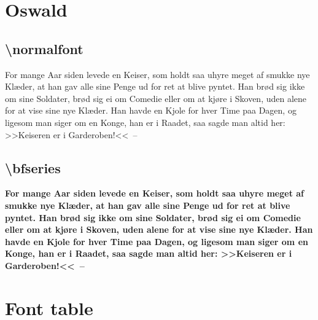 \documentclass[danish,a4paper,11pt]{scrartcl}
\begin{document}
\section*{Oswald}
\subsection*{\textbackslash normalfont}
\normalfont
  For mange Aar siden levede en Keiser, som holdt saa uhyre meget af
   smukke nye Kl\ae der, at han gav alle sine Penge ud for ret at blive
   pyntet. Han br\o d sig ikke om sine Soldater, br\o d sig ei om
   Comedie eller om at kj\o re i Skoven, uden alene for at vise sine
   nye Kl\ae der. Han havde en Kjole for hver Time paa Dagen, og
   ligesom man siger om en Konge, han er i Raadet, saa sagde man altid
   her: >>Keiseren er i Garderoben!<<~--

\subsection*{\textbackslash bfseries}
\normalfont\bfseries
  For mange Aar siden levede en Keiser, som holdt saa uhyre meget af
   smukke nye Kl\ae der, at han gav alle sine Penge ud for ret at blive
   pyntet. Han br\o d sig ikke om sine Soldater, br\o d sig ei om
   Comedie eller om at kj\o re i Skoven, uden alene for at vise sine
   nye Kl\ae der. Han havde en Kjole for hver Time paa Dagen, og
   ligesom man siger om en Konge, han er i Raadet, saa sagde man altid
   her: >>Keiseren er i Garderoben!<<~--

\newpage
\normalfont
\section*{Font table}
 \def\tfont{\usefont{T1}{fve}{m}{n}\selectfont}
 \newcount\currchar
 \def\showchar{\makebox[.09\linewidth]{\strut\char\currchar\hfill\tfont\tiny\the\currchar}
   \global\advance\currchar1}
 
\end{document}
